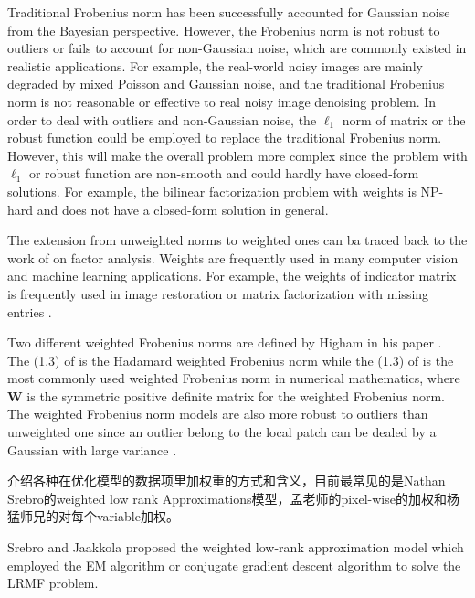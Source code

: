 \documentclass[10pt,twocolumn,letterpaper]{article}
\begin{document}
Traditional Frobenius norm has been successfully accounted for Gaussian noise from the Bayesian perspective. However, the Frobenius norm is not robust to outliers or fails to account for non-Gaussian noise, which are commonly existed in realistic applications. For example, the real-world noisy images are mainly degraded by mixed Poisson and Gaussian noise, and the traditional Frobenius norm is not reasonable or effective to real noisy image denoising problem. In order to deal with outliers and non-Gaussian noise, the $\ell_{1}$ norm of matrix or the robust function \cite{huber1973robust} could be employed to replace the traditional Frobenius norm. However, this will make the overall problem more complex since the problem with $\ell_{1}$ or robust function are non-smooth and could hardly have closed-form solutions. For example, the bilinear factorization problem with weights \cite{srebro2003weighted} is NP-hard and does not have a closed-form solution in general. 

The extension from unweighted norms to weighted ones can ba traced back to the work of \cite{young1941maximum} on factor analysis. Weights are frequently used in many computer vision and machine learning applications. For example, the weights of indicator matrix is frequently used in image restoration \cite{} or matrix factorization with missing entries \cite{srebro2003weighted}. 


Two different weighted Frobenius norms are defined by Higham in his paper \cite{higham2002computing}. The (1.3) of \cite{higham2002computing} is the Hadamard weighted Frobenius norm while the (1.3) of \cite{higham2002computing} is the most commonly used weighted Frobenius norm in numerical mathematics, where $\mathbf{W}$ is the symmetric positive definite matrix for the weighted Frobenius norm. The weighted Frobenius norm models are also more robust to outliers than unweighted one since an outlier belong to the local patch can be dealed by a Gaussian with large variance \cite{meng2013robust}.

介绍各种在优化模型的数据项里加权重的方式和含义，目前最常见的是Nathan Srebro的weighted low rank Approximations模型，孟老师的pixel-wise的加权和杨猛师兄的对每个variable加权。

Srebro and Jaakkola \cite{srebro2003weighted} proposed the weighted low-rank approximation model which employed the EM algorithm or conjugate gradient descent algorithm to solve the LRMF problem. 
\end{document}
